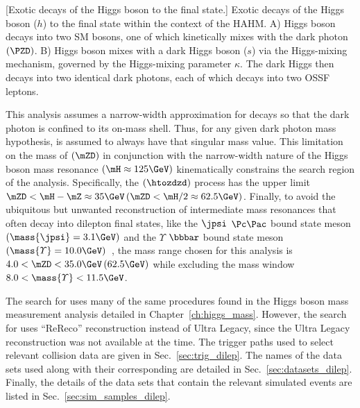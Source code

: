 \begin{multiFigure}
        \centering
            [Exotic decays of the Higgs boson to the \fourl final state.]
            {Exotic decays of the Higgs boson ($h$) to the \fourl final state within the context of the HAHM.
            A) Higgs boson decays into two SM \PZ bosons, one of which kinetically mixes with the dark photon $\left(\PZD\right)$.
            B) Higgs boson mixes with a dark Higgs boson ($s$) via the Higgs-mixing mechanism, governed by the Higgs-mixing parameter $\kappa$.
            The dark Higgs then decays into two identical dark photons, each of which decays into two OSSF leptons.}
        \label{fig:feyn_diag_hzzd4l_hzdzd4l}
\end{multiFigure}

This analysis assumes a narrow-width approximation for \PZD decays so that the dark photon is confined to its on-mass shell.
Thus, for any given dark photon mass hypothesis, \PZD is assumed to always have that singular mass value.
This limitation on the mass of \PZD $\left(\mZD\right)$ in conjunction with the narrow-width nature of the Higgs boson mass resonance $\left( \mH \approx 125\GeV \right)$ kinematically constrains the search region of the analysis.
Specifically, the \htozzd $\left(\htozdzd\right)$ process has the upper limit
$\mZD < \mH - \mZ \approx 35\GeV    \left(\mZD < \mH / 2 \approx 62.5\GeV\right)$.
Finally, to avoid the ubiquitous but unwanted reconstruction of intermediate mass resonances that often decay into dilepton final states,
like the $\jpsi$ $\Pc\Pac$ bound state meson $\left( \mass{\jpsi} = 3.1\GeV \right)$ and the $\varUpsilon$ $\bbbar$ bound state meson $\left( \mass{\varUpsilon} = 10.0\GeV \right)$~\cite{particle_data_group_review_2020},
the mass range chosen for this analysis is $4.0 < \mZD < 35.0\GeV \left(62.5\GeV\right)$ while excluding the mass window $8.0 < \mass{\varUpsilon} < 11.5\GeV$.

The search for \PZD uses many of the same procedures found in the Higgs boson mass measurement analysis detailed in Chapter~\ref{ch:higgs_mass}.
However, the search for \PZD uses ``ReReco'' reconstruction instead of Ultra Legacy, since the Ultra Legacy reconstruction was not available at the time.
The trigger paths used to select relevant \pp collision data are given in Sec.~\ref{sec:trig_dilep}.
The names of the data sets used along with their corresponding \lumiint are detailed in Sec.~\ref{sec:datasets_dilep}.
Finally, the details of the data sets that contain the relevant simulated events are listed in Sec.~\ref{sec:sim_samples_dilep}.

